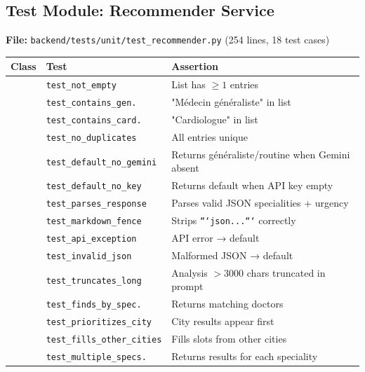 \documentclass[12pt, a4paper]{article}
\newcommand{\file}[1]{\texttt{\color{accent}#1}}
\begin{document}
\subsection{Test Module: Recommender Service}

\textbf{File:} \file{backend/tests/unit/test\_recommender.py} \quad
(254 lines, 18 test cases)

\begin{longtable}{p{3.8cm} p{3cm} p{6.5cm}}
  \toprule
  \textbf{Class} & \textbf{Test} & \textbf{Assertion} \\
  \midrule
    & \texttt{test\_not\_empty}         & List has $\geq 1$ entries \\
    & \texttt{test\_contains\_gen.}     & "Médecin généraliste" in list \\
    & \texttt{test\_contains\_card.}    & "Cardiologue" in list \\
    & \texttt{test\_no\_duplicates}     & All entries unique \\
  \midrule
    & \texttt{test\_default\_no\_gemini}  & Returns généraliste/routine when Gemini absent \\
    & \texttt{test\_default\_no\_key}     & Returns default when API key empty \\
    & \texttt{test\_parses\_response}     & Parses valid JSON specialities + urgency \\
    & \texttt{test\_markdown\_fence}      & Strips \texttt{```json...```} correctly \\
    & \texttt{test\_api\_exception}       & API error → default \\
    & \texttt{test\_invalid\_json}        & Malformed JSON → default \\
    & \texttt{test\_truncates\_long}      & Analysis $> 3000$ chars truncated in prompt \\
  \midrule
    & \texttt{test\_finds\_by\_spec.}     & Returns matching doctors \\
    & \texttt{test\_prioritizes\_city}    & City results appear first \\
    & \texttt{test\_fills\_other\_cities} & Fills slots from other cities \\
    & \texttt{test\_multiple\_specs.}     & Returns results for each speciality \\

\end{longtable}
\end{document}
